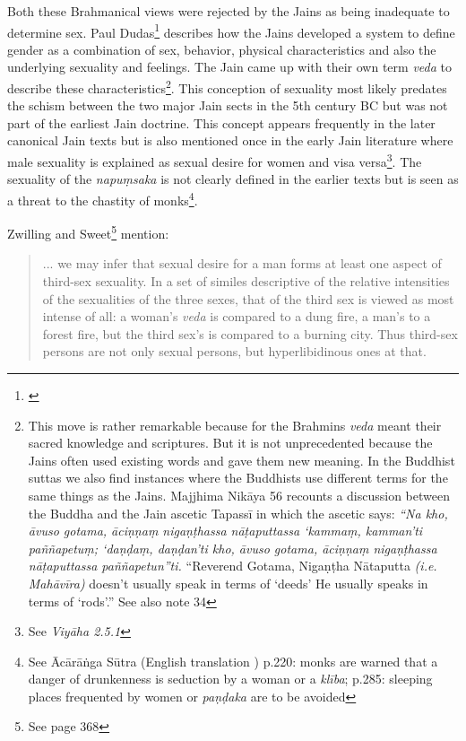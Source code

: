 Both these Brahmanical views were rejected by the Jains as being inadequate to determine sex. Paul Dudas\footnote{\cite{dundas}} describes how the Jains developed a system to define gender as a combination of sex, behavior, physical characteristics and also the underlying sexuality and feelings. The Jain came up with their own term {\em veda} to describe these characteristics\footnote{This move is rather remarkable because for the Brahmins {\em veda} meant their sacred knowledge and scriptures. But it is not unprecedented because the Jains often used existing words and gave them new meaning. In the Buddhist suttas we also find instances where the Buddhists use different terms for the same things as the Jains. Majjhima Nikāya 56 recounts a discussion between the Buddha and the Jain ascetic Tapassī in which the ascetic says: {\em “Na kho, āvuso gotama, āciṇṇaṃ nigaṇṭhassa nāṭaputtassa ‘kammaṃ, kamman’ti paññapetuṃ; ‘daṇḍaṃ, daṇḍan’ti kho, āvuso gotama, āciṇṇaṃ nigaṇṭhassa nāṭaputtassa paññapetun”ti.} “Reverend Gotama, Nigaṇṭha Nātaputta {\em (i.e. Mahāvīra)} doesn’t usually speak in terms of ‘deeds’ He usually speaks in terms of ‘rods’.” See also \cite{zwilling} note 34}. This conception of sexuality most likely predates the schism between the two major Jain sects in the 5th century BC but was not part of the earliest Jain doctrine. This concept appears frequently in the later canonical Jain texts but is also mentioned once in the early Jain literature where male sexuality is explained as sexual desire for women and visa versa\footnote{See {\em Viyāha 2.5.1}}. The sexuality of the {\em napuṃsaka} is not clearly defined in the earlier texts but is seen as a threat to the chastity of monks\footnote{See Ācārāṅga Sūtra (English translation \cite{jacobi}) p.220: monks are warned that a danger of drunkenness is seduction by a woman or a {\em klība}; p.285: sleeping places frequented by women or {\em paṇḍaka} are to be avoided}.

Zwilling and Sweet\footnote{See \cite{zwilling} page 368} mention:

\begin{quote}
... we may infer that sexual desire for a man forms at least one aspect of third-sex sexuality. In a set of similes descriptive of the relative intensities of the sexualities of the three sexes, that of the third sex is viewed as most intense of all: a woman's {\em veda} is compared to a dung fire, a man's to a forest fire, but the third sex's is compared to a burning city. Thus third-sex persons are not only sexual persons, but hyperlibidinous ones at that.
\end{quote}

